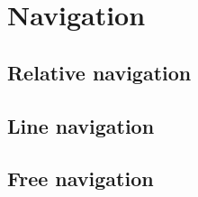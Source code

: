\section{Navigation} %
\label{sec:mr_navigation}


    \subsection{Relative navigation} %
    \label{sub:mr_relative_navigation}
    



    \subsection{Line navigation} %
    \label{sub:mr_line_navigation}
    



    \subsection{Free navigation} %
    \label{sub:mr_free_navigation}
    
